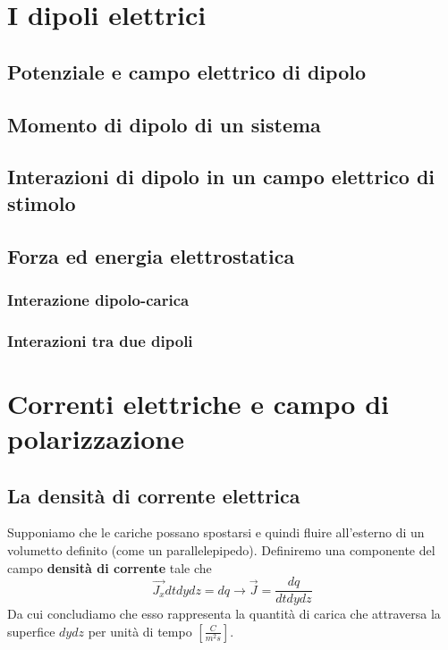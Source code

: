 \documentclass{book}
\begin{document}
\chapter{I dipoli elettrici}
\section{Potenziale e campo elettrico di dipolo}
\section{Momento di dipolo di un sistema}
\section{Interazioni di dipolo in un campo elettrico di stimolo}
\section{Forza ed energia elettrostatica}
\subsection{Interazione dipolo-carica}
\subsection{Interazioni tra due dipoli}

\chapter{Correnti elettriche e campo di polarizzazione}
\section{La densit\`a di corrente elettrica}
Supponiamo che le cariche possano spostarsi e quindi fluire all'esterno di un volumetto definito (come un parallelepipedo).
Definiremo una componente del campo \textbf{densità di corrente} tale che
\[
  \vec{J_x} dt dy dz = dq \rightarrow \vec{J} = \frac{dq}{dt dy dz}
\]
Da cui concludiamo che esso rappresenta la quantità di carica che attraversa la superfice $dydz$ per unità di tempo $\left[\frac{C}{m^2s}\right]$.
\begin{center}
\end{center}
\end{document}
